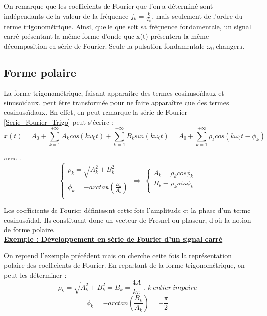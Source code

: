 	
	
	On remarque que les coefficients de Fourier que l'on a déterminé sont indépendants de la valeur de la fréquence $f_{k}=\frac{k}{T_{0}}$, mais seulement de l'ordre du terme trigonométrique. Ainsi, quelle que soit sa fréquence fondamentale, un signal carré présentant la même forme d'onde que x(t) présentera la même décomposition en série de Fourier. Seule la pulsation fondamentale $\omega_{0}$ changera.
	
	
	\subsection{Forme polaire}
	
	La forme trigonométrique, faisant apparaitre des termes cosinusoïdaux et sinusoïdaux, peut être transformée pour ne faire apparaître que des termes cosinusoïdaux. En effet, on peut remarque la série de Fourier \ref{Serie_Fourier_Trigo} peut s'écrire :
	\begin{equation}\label{Serie_Fourier_Polaire}
	x(t)=A_{0}+\sum_{k=1}^{+\infty}A_{k}cos(k\omega_{0}t)+\sum_{k=1}^{+\infty}B_{k}sin(k\omega_{0}t)=A_{0}+\sum_{k=1}^{+\infty} \rho_{k}cos(k\omega_{0}t-\phi_{k})
	\end{equation}
	
	avec :
	\begin{equation}\label{Coef_Serie_Fourier_polaire}
	\left \{
	\begin{array}{l}
	\rho_{k}=\sqrt{A_{k}^{2}+B_{k}^{2}} \\
	\phi_{k}=-arctan(\frac{B_{k}}{A_{k}}) \\
	\end{array}
	\right . ~\Rightarrow~	\left \{
	\begin{array}{l}
	A_{k}=\rho_{k}cos\phi_{k} \\
	B_{k}=\rho_{k}sin\phi_{k} \\
	\end{array}
	\right .
	\end{equation}
	
	Les coefficients de Fourier définissent cette fois l'amplitude et la phase d'un terme cosinusoïdal. Ils constituent donc un vecteur de Fresnel ou phaseur, d'où la notion de forme polaire.\\
	
	\underline{\textbf{Exemple : Développement en série de Fourier d'un signal carré\\}}
	
	On reprend l'exemple précédent mais on cherche cette fois la représentation polaire des coefficients de Fourier. En repartant de la forme trigonométrique, on peut les déterminer :
	\begin{equation*}
	\rho_{k}=\sqrt{A_{k}^{2}+B_{k}^{2}}=B_{k}=\frac{4A}{k\pi}~,~k~entier~impaire
	\end{equation*}
	\begin{equation*}
	\phi_{k}=-arctan(\frac{B_{k}}{A_{k}})=-\frac{\pi}{2}
	\end{equation*}
	
